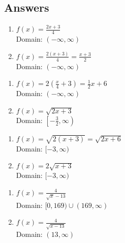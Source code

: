 \newpage

\subsection{Answers}

\begin{multicols}{2}
\begin{enumerate}

\item $f(x) = \frac{2x+3}{4}$ \\  Domain:  $(-\infty, \infty)$ 

\item $f(x) = \frac{2(x+3)}{4} = \frac{x+3}{2}$ \\  Domain:  $(-\infty, \infty)$ 

\setcounter{HW}{\value{enumi}}
\end{enumerate}
\end{multicols}

\begin{multicols}{2}
\begin{enumerate}
\setcounter{enumi}{\value{HW}}

\item $f(x) = 2\left(\frac{x}{4} + 3\right) = \frac{1}{2} x + 6$ \\ Domain:  $(-\infty, \infty)$  

\item $f(x) = \sqrt{2x+3}$ \\ Domain:  $\left[ -\frac{3}{2}, \infty \right)$

\setcounter{HW}{\value{enumi}}
\end{enumerate}
\end{multicols}

\begin{multicols}{2}
\begin{enumerate}
\setcounter{enumi}{\value{HW}}

\item $f(x) = \sqrt{2(x+3)} = \sqrt{2x+6}$ \\ Domain: $[-3, \infty)$

\item $f(x) = 2\sqrt{x+3}$ \\ Domain:  $[-3, \infty)$

\setcounter{HW}{\value{enumi}}
\end{enumerate}
\end{multicols}

\begin{multicols}{2}
\begin{enumerate}
\setcounter{enumi}{\value{HW}}


\item $f(x) = \frac{4}{\sqrt{x} - 13}$ \\ Domain: $[0, 169) \cup (169, \infty)$
\item $f(x) = \frac{4}{\sqrt{x - 13}}$ \\ Domain: $(13, \infty)$

\setcounter{HW}{\value{enumi}}
\end{enumerate}
\end{multicols}

